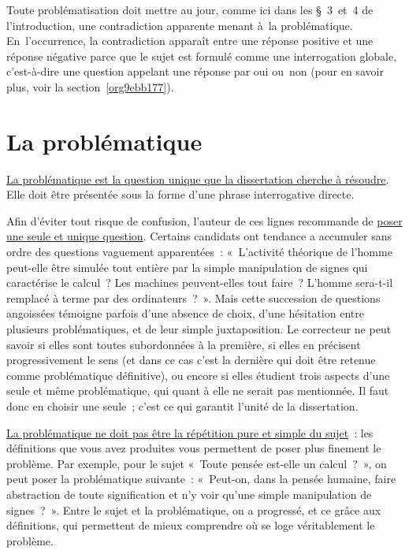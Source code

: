 \documentclass[a4paper,12pt]{report}
\begin{document}
Toute problématisation doit mettre au jour, comme ici dans les § 3 et 4
de l'introduction, une contradiction apparente menant à la
problématique. En l'occurrence, la contradiction apparaît entre une
réponse positive et une réponse négative parce que le sujet est formulé
comme une interrogation globale, c'est-à-dire une question appelant une
réponse par oui ou non (pour en savoir plus, voir la section \ref{org9ebb177}).


\section{La problématique}
\label{sec:org80d671f}

\uline{La problématique est la question unique que la dissertation cherche à
résoudre}. Elle doit être présentée sous la forme d'une phrase
interrogative directe.

Afin d'éviter tout risque de confusion, l'auteur de ces lignes
recommande de \uline{poser une seule et unique question}. Certains candidats
ont tendance a accumuler sans ordre des questions vaguement
apparentées : « L'activité théorique de l'homme peut-elle être simulée
tout entière par la simple manipulation de signes qui caractérise le
calcul ? Les machines peuvent-elles tout faire ? L'homme sera-t-il
remplacé à terme par des ordinateurs ? ». Mais cette succession de
questions angoissées témoigne parfois d'une absence de choix, d'une
hésitation entre plusieurs problématiques, et de leur simple
juxtaposition. Le correcteur ne peut savoir si elles sont toutes
subordonnées à la première, si elles en précisent progressivement le
sens (et dans ce cas c'est la dernière qui doit être retenue comme
problématique définitive), ou encore si elles étudient trois aspects
d'une seule et même problématique, qui quant à elle ne serait pas
mentionnée. Il faut donc en choisir une seule ; c'est ce qui garantit
l'unité de la dissertation.

\uline{La problématique ne doit pas être la répétition pure et simple du
sujet} : les définitions que vous avez produites vous permettent de
poser plus finement le problème. Par exemple, pour le sujet « Toute
pensée est-elle un calcul ? », on peut poser la problématique suivante :
« Peut-on, dans la pensée humaine, faire abstraction de toute
signification et n'y voir qu'une simple manipulation de signes ? ».
Entre le sujet et la problématique, on a progressé, et ce grâce aux
définitions, qui permettent de mieux comprendre où se loge véritablement
le problème.
\end{document}
